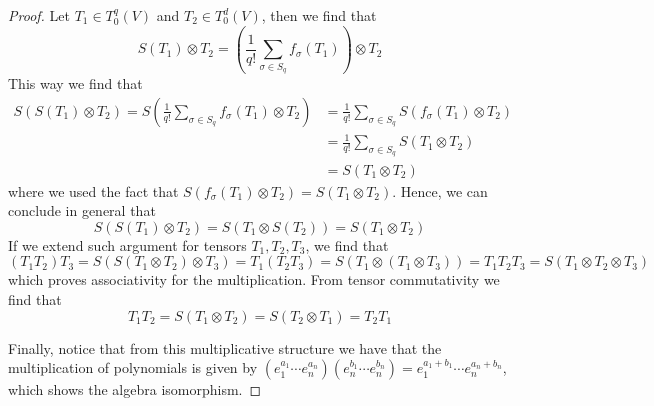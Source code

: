 \begin{proof}
    Let \(T_1 \in T_0^q(V)\) and \(T_2 \in T_0^d(V)\), then we find that
    \[
        S(T_1) \otimes T_2 = \left( \frac{1}{q!} \sum_{\sigma \in S_q}
        f_\sigma(T_1) \right) \otimes T_2
    \]
    This way we find that
    \begin{align*}
        S(S(T_1) \otimes T_2) = S \left( \frac{1}{q!} \sum_{\sigma \in S_q}
        f_\sigma(T_1) \otimes T_2 \right)
         & = \frac{1}{q!} \sum_{\sigma \in S_q} S(f_\sigma(T_1) \otimes T_2)
        \\
         & = \frac{1}{q!} \sum_{\sigma \in S_q} S(T_1 \otimes T_2)           \\
         & = S(T_1 \otimes T_2)
    \end{align*}
    where we used the fact that \(S(f_\sigma(T_1) \otimes T_2) = S(T_1 \otimes
    T_2)\). Hence, we can conclude in general that
    \[
        S(S(T_1) \otimes T_2) = S(T_1 \otimes S(T_2)) = S(T_1 \otimes T_2)
    \]
    If we extend such argument for tensors \(T_1, T_2, T_3\), we find that
    \[
        (T_1 T_2) T_3 = S(S(T_1 \otimes T_2) \otimes T_3)
        = T_1 (T_2 T_3) = S(T_1 \otimes (T_1 \otimes T_3))
        = T_1 T_2 T_3 = S(T_1 \otimes T_2 \otimes T_3)
    \]
    which proves associativity for the multiplication. From tensor commutativity
    we find that
    \[
        T_1 T_2 = S(T_1 \otimes T_2) = S(T_2 \otimes T_1) = T_2 T_1
    \]

    Finally, notice that from this multiplicative structure we have that the
    multiplication of polynomials is given by
    \((e_1^{a_1} \cdots e_n^{a_n}) (e_n^{b_1} \cdots e_n^{b_n}) = e_1^{a_1 + b_1} \cdots e_n^{a_n
    + b_n}\), which shows the algebra isomorphism.
\end{proof}

